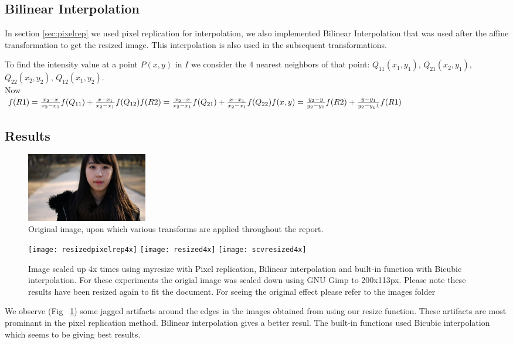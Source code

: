 \documentclass[paper=a4, fontsize=11pt]{scrartcl} %
\numberwithin{equation}{section} %
\numberwithin{figure}{section} %
\numberwithin{table}{section} %
\begin{document}
    \subsection{Bilinear Interpolation}

    In section \ref{sec:pixelrep} we used pixel replication for interpolation, we also implemented Bilinear Interpolation that was used after the affine transformation to get the resized image. This interpolation is also used in the subsequent transformations.

    To find the intensity value at a point \(P(x,y)\) in \(I\) we consider the 4 nearest neighbors of that point: 
    \(Q_{11}(x_1,y_1)\), \(Q_{21}(x_2,y_1)\), \(Q_{22}(x_2,y_2)\), \(Q_{12}(x_1,y_2)\).
    \\Now\\
    \(
        f(R1) = \frac{x_2-x}{x_2-x_1}f(Q_{11}) + \frac{x-x_1}{x_2-x_1}f(Q_{12})
        \\
        f(R2) = \frac{x_2-x}{x_2-x_1}f(Q_{21}) + \frac{x-x_1}{x_2-x_1}f(Q_{22})
        \\
        f(x,y) = \frac{y_2-y}{y_2-y_1}f(R2) + \frac{y-y_1}{y_2-y_y1}f(R1)
    \)

    \subsection{Results}
      \begin{figure}[h!]
        \centering
        \includegraphics[clip,height=3cm]{1}
        \caption{Original image, upon which various transforms are applied throughout the report.}
      \end{figure}

      \begin{figure} 
        \centering
        \texttt{[image: resizedpixelrep4x]}
        \texttt{[image: resized4x]}
        \texttt{[image: scvresized4x]}
        \caption{Image scaled up 4x times using myresize with Pixel replication,  Bilinear interpolation and built-in function with Bicubic interpolation. For these experiments the origial image was scaled down using GNU Gimp to 200x113px. Please note these results have been resized again to fit the document. For seeing the original effect please refer to the images folder}
        \label{fig:resizeResults}
      \end{figure}
      We observe (Fig ~\ref{fig:resizeResults}) some jagged artifacts around the edges in the images obtained from using our resize function. These artifacts are most prominant in the pixel replication method. Bilinear interpolation gives a better resul. The built-in functions used Bicubic interpolation which seems to be giving best results.
\end{document}
